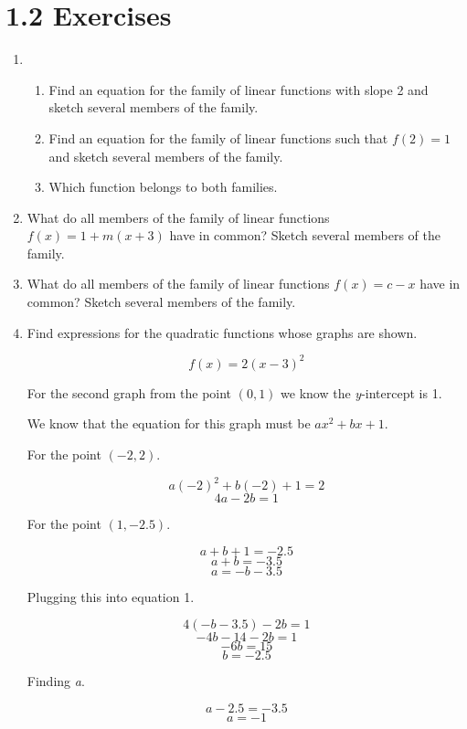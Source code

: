 \documentclass{article}
\begin{document}
	\section{1.2 Exercises}
	
	\begin{enumerate}
		\item
		\begin{enumerate}
			\item Find an equation for the family of linear functions with slope 2
				and sketch several members of the family.
				
			\item Find an equation for the family of linear functions such that
				$f(2) = 1$ and sketch several members of the family.
				
			\item Which function belongs to both families.
		\end{enumerate}
		
		\item What do all members of the family of linear functions $f(x) = 1 + m(x + 3)$ have in common?
			Sketch several members of the family.
		
		\item What do all members of the family of linear functions $f(x) = c - x$ have in common?
			Sketch several members of the family.
			
		\item Find expressions for the quadratic functions whose graphs are shown.
		
			$$f(x) = 2(x - 3)^2$$
			
			For the second graph from the point $(0, 1)$ we know the \emph{y}-intercept is 1.
			
			We know that the equation for this graph must be $ax^2 + bx + 1$.
			
			For the point $(-2, 2)$.
			
			$$a(-2)^2 + b(-2) + 1 = 2$$
			$$4a - 2b = 1$$
			
			For the point $(1, -2.5)$.
			
			$$a + b + 1 = -2.5$$
			$$a + b = -3.5$$
			$$a = -b - 3.5$$
			
			Plugging this into equation 1.
			
			$$4(-b -3.5) - 2b = 1$$
			$$-4b - 14 - 2b = 1$$
			$$-6b = 15$$
			$$b = - 2.5$$
			
			Finding \emph{a}.
			
			$$a -2.5 = -3.5$$
			$$ a = - 1$$
			

\end{enumerate}
\end{document}
